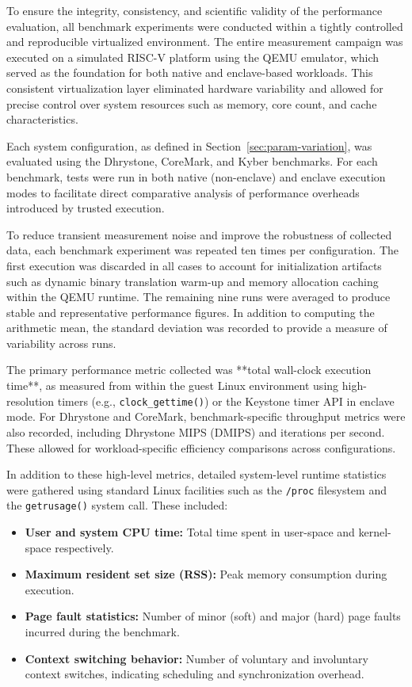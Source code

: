 To ensure the integrity, consistency, and scientific validity of the performance evaluation, all benchmark experiments were conducted within a tightly controlled and reproducible virtualized environment. The entire measurement campaign was executed on a simulated RISC-V platform using the QEMU emulator, which served as the foundation for both native and enclave-based workloads. This consistent virtualization layer eliminated hardware variability and allowed for precise control over system resources such as memory, core count, and cache characteristics.

Each system configuration, as defined in Section~\ref{sec:param-variation}, was evaluated using the Dhrystone, CoreMark, and Kyber benchmarks. For each benchmark, tests were run in both native (non-enclave) and enclave execution modes to facilitate direct comparative analysis of performance overheads introduced by trusted execution.

To reduce transient measurement noise and improve the robustness of collected data, each benchmark experiment was repeated ten times per configuration. The first execution was discarded in all cases to account for initialization artifacts such as dynamic binary translation warm-up and memory allocation caching within the QEMU runtime. The remaining nine runs were averaged to produce stable and representative performance figures. In addition to computing the arithmetic mean, the standard deviation was recorded to provide a measure of variability across runs.

The primary performance metric collected was **total wall-clock execution time**, as measured from within the guest Linux environment using high-resolution timers (e.g., \texttt{clock\_gettime()}) or the Keystone timer API in enclave mode. For Dhrystone and CoreMark, benchmark-specific throughput metrics were also recorded, including Dhrystone MIPS (DMIPS) and iterations per second. These allowed for workload-specific efficiency comparisons across configurations.

In addition to these high-level metrics, detailed system-level runtime statistics were gathered using standard Linux facilities such as the \texttt{/proc} filesystem and the \texttt{getrusage()} system call. These included:

\begin{itemize}
    \item \textbf{User and system CPU time:} Total time spent in user-space and kernel-space respectively.
    \item \textbf{Maximum resident set size (RSS):} Peak memory consumption during execution.
    \item \textbf{Page fault statistics:} Number of minor (soft) and major (hard) page faults incurred during the benchmark.
    \item \textbf{Context switching behavior:} Number of voluntary and involuntary context switches, indicating scheduling and synchronization overhead.
\end{itemize}

